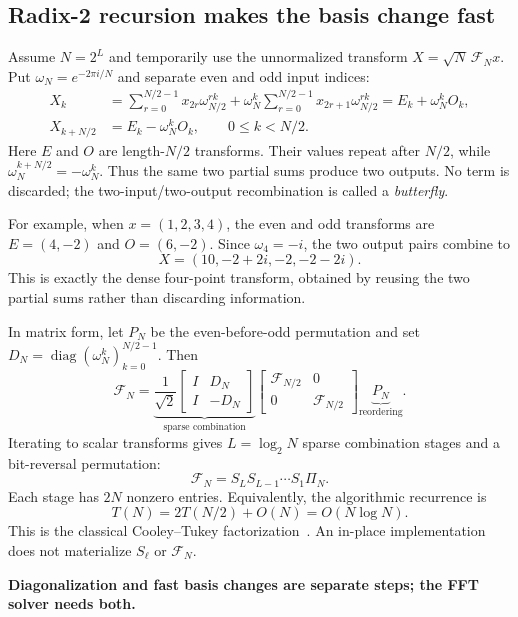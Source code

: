 \documentclass[11pt,a4paper]{article}
\numberwithin{equation}{section}
\newcommand{\takeaway}[1]{\begin{center}\colorbox{light}{\parbox{0.94\linewidth}{\vspace{5pt}\centering\textbf{#1}\vspace{5pt}}}\end{center}}
\begin{document}
\subsection{Radix-2 recursion makes the basis change fast}
Assume $N=2^L$ and temporarily use the unnormalized transform $X=\sqrt N\,\mathcal F_Nx$. Put $\omega_N=e^{-2\pi i/N}$ and separate even and odd input indices:
\begin{align}
 X_k&=\sum_{r=0}^{N/2-1}x_{2r}\omega_{N/2}^{rk}
      +\omega_N^k\sum_{r=0}^{N/2-1}x_{2r+1}\omega_{N/2}^{rk}
      =E_k+\omega_N^kO_k,\\
 X_{k+N/2}&=E_k-\omega_N^kO_k,
 \qquad 0\le k<N/2.
 \label{eq:cooley-tukey}
\end{align}
Here $E$ and $O$ are length-$N/2$ transforms. Their values repeat after $N/2$, while $\omega_N^{k+N/2}=-\omega_N^k$. Thus the same two partial sums produce two outputs. No term is discarded; the two-input/two-output recombination is called a \emph{butterfly}.

For example, when $x=(1,2,3,4)$, the even and odd transforms are $E=(4,-2)$ and $O=(6,-2)$. Since $\omega_4=-i$, the two output pairs combine to
\begin{equation}
 X=(10,-2+2i,-2,-2-2i).
\end{equation}
This is exactly the dense four-point transform, obtained by reusing the two partial sums rather than discarding information.

In matrix form, let $P_N$ be the even-before-odd permutation and set $D_N=\operatorname{diag}(\omega_N^k)_{k=0}^{N/2-1}$. Then
\begin{equation}
 \mathcal F_N=
 \underbrace{\frac1{\sqrt2}
 \begin{bmatrix}I&D_N\\I&-D_N\end{bmatrix}}_{\text{sparse combination}}
 \begin{bmatrix}\mathcal F_{N/2}&0\\0&\mathcal F_{N/2}\end{bmatrix}
 \underbrace{P_N}_{\text{reordering}}.
 \label{eq:fft-step}
\end{equation}
Iterating to scalar transforms gives $L=\log_2N$ sparse combination stages and a bit-reversal permutation:
\begin{equation}
 \mathcal F_N=S_LS_{L-1}\cdots S_1\Pi_N.
 \label{eq:fft-stages}
\end{equation}
Each stage has $2N$ nonzero entries. Equivalently, the algorithmic recurrence is
\[
 T(N)=2T(N/2)+O(N)=O(N\log N).
\]
This is the classical Cooley--Tukey factorization~\cite{cooley1965fft}. An in-place implementation does not materialize $S_\ell$ or $\mathcal F_N$.
\takeaway{Diagonalization and fast basis changes are separate steps; the FFT solver needs both.}
\end{document}

